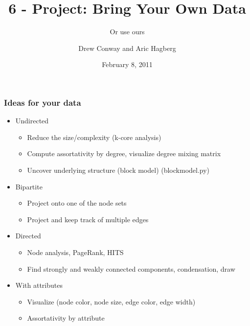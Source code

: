 \documentclass[xcolor=dvipsnames, 9pt]{beamer}
\title{6 - Project: Bring Your Own Data}
\subtitle{Or use ours}
\author{Drew Conway and Aric Hagberg}
\date{February 8, 2011}
\begin{document}
\begin{frame}[plain]
\titlepage
\end{frame}

\begin{frame}
\frametitle{Ideas for your data}
\begin{itemize}
   \item Undirected
   \begin{itemize}
      \item Reduce the size/complexity (k-core analysis)
      \item Compute assortativity by degree, visualize degree mixing matrix
      \item Uncover underlying structure (block model) (blockmodel.py)
   \end{itemize}
   \item Bipartite
   \begin{itemize}
       \item Project onto one of the node sets
       \item Project and keep track of multiple edges 
   \end{itemize}
   \item Directed
   \begin{itemize}
      \item Node analysis, PageRank, HITS
      \item Find strongly and weakly connected components, condensation, draw
   \end{itemize}
   \item With attributes 
   \begin{itemize}
      \item Visualize (node color, node size, edge color, edge width)
      \item Assortativity by attribute
   \end{itemize}
\end{itemize}
\end{frame}
\end{document}
